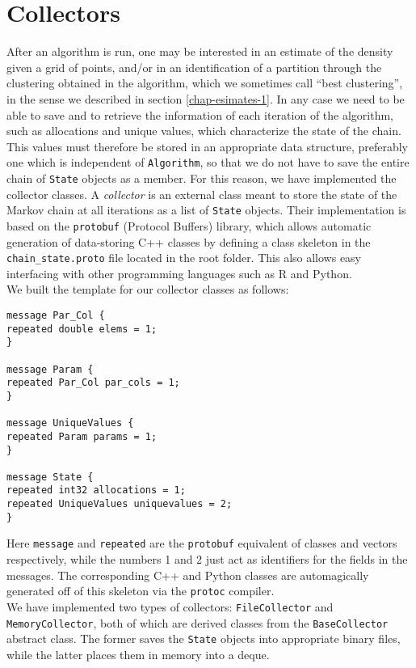\section{Collectors}\label{collectors}
After an algorithm is run, one may be interested in an estimate of the density given a grid of points, and/or in an identification of a partition through the clustering obtained in the algorithm, which we sometimes call ``best clustering'', in the sense we described in section \ref{chap-esimates-1}.
In any case we need to be able to save and to retrieve the information of each iteration of the algorithm, such as allocations and unique values, which characterize the state of the chain.
This values must therefore be stored in an appropriate data structure, preferably one which is independent of \verb|Algorithm|, so that we do not have to save the entire chain of \verb|State| objects as a member.
For this reason, we have implemented the collector classes.
A \emph{collector} is an external class meant to store the state of the Markov chain at all iterations as a list of \verb|State| objects.
Their implementation is based on the \verb|protobuf| (Protocol Buffers) library, which allows automatic generation of data-storing C++ classes by defining a class skeleton in the \verb|chain_state.proto| file located in the root folder.
This also allows easy interfacing with other programming languages such as R and Python. \\
We built the template for our collector classes as follows:
\begin{verbatim}
message Par_Col {
repeated double elems = 1;
}

message Param {
repeated Par_Col par_cols = 1;
}

message UniqueValues {
repeated Param params = 1;
}

message State {
repeated int32 allocations = 1;
repeated UniqueValues uniquevalues = 2;
}
\end{verbatim}
Here \verb|message| and \verb|repeated| are the \verb|protobuf| equivalent of classes and vectors respectively, while the numbers 1 and 2 just act as identifiers for the fields in the messages.
The corresponding C++ and Python classes are automagically generated off of this skeleton via the \verb|protoc| compiler. \\
We have implemented two types of collectors: \verb|FileCollector| and \verb|MemoryCollector|, both of which are derived classes from the \verb|BaseCollector| abstract class.
The former saves the \verb|State| objects into appropriate binary files, while the latter places them in memory into a deque.
